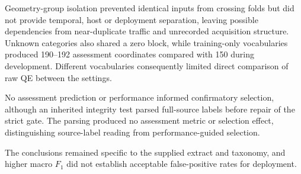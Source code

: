 Geometry-group isolation prevented identical inputs from crossing folds but did not provide temporal, host or deployment separation, leaving possible dependencies from near-duplicate traffic and unrecorded acquisition structure. Unknown categories also shared a zero block, while training-only vocabularies produced 190--192 assessment coordinates compared with 150 during development. Different vocabularies consequently limited direct comparison of raw QE between the settings.

No assessment prediction or performance informed confirmatory selection, although an inherited integrity test parsed full-source labels before repair of the strict gate. The parsing produced no assessment metric or selection effect, distinguishing source-label reading from performance-guided selection.

The conclusions remained specific to the supplied extract and taxonomy, and higher macro $F_1$ did not establish acceptable false-positive rates for deployment.

